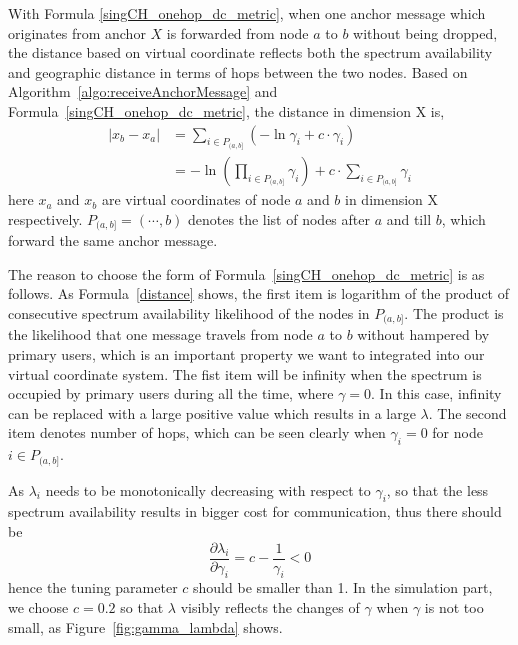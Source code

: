 With Formula \ref{singCH_onehop_dc_metric}, when one anchor message which originates from anchor $X$ is forwarded from node $a$ to $b$ without being dropped, the distance based on virtual coordinate reflects both the spectrum availability and geographic distance in terms of hops between the two nodes.
Based on Algorithm~\ref{algo:receiveAnchorMessage} and Formula~\ref{singCH_onehop_dc_metric}, the distance in dimension X is, 
\begin{equation}\label{distance}
\begin{split}
|x_b-x_a| & =  \sum_{i\in P_{(a,b]}} (-\ln\gamma_i + c\cdot \gamma_i) \\
		  & = -\ln(\prod_{i\in P_{(a,b]}} \gamma_i) + c\cdot \sum_{i\in P_{(a,b]}} \gamma_i
\end{split}
\end{equation}
here $x_a$ and $x_b$ are virtual coordinates of node $a$ and $b$ in dimension X respectively.
$P_{(a,b]}=(\cdots, b)$ denotes the list of nodes after $a$ and till $b$, which forward the same anchor message.

The reason to choose the form of Formula~\ref{singCH_onehop_dc_metric} is as follows.
As Formula~\ref{distance} shows, the first item is logarithm of the product of consecutive spectrum availability likelihood of the nodes in $P_{(a,b]}$.
The product is the likelihood that one message travels from node $a$ to $b$ without hampered by primary users, which is an important property we want to integrated into our virtual coordinate system.
The fist item will be infinity when the spectrum is occupied by primary users during all the time, where $\gamma=0$.
In this case, infinity can be replaced with a large positive value which results in a large $\lambda$.
The second item denotes number of hops, which can be seen clearly when $\gamma_i=0$ for node $i\in P_{(a,b]}$.

As $\lambda_i$ needs to be monotonically decreasing with respect to $\gamma_i$, so that the less spectrum availability results in bigger cost for communication, thus there should be
\begin{equation}
\frac{\partial\lambda_i}{\partial\gamma_i} = c -\frac{1}{\gamma_i} <0
\label{singCH_dc_metric_decreasing}
\end{equation} 
hence the tuning parameter $c$ should be smaller than 1.
In the simulation part, we choose $c=0.2$ so that $\lambda$ visibly reflects the changes of $\gamma$ when $\gamma$ is not too small, as Figure~\ref{fig:gamma_lambda} shows.

